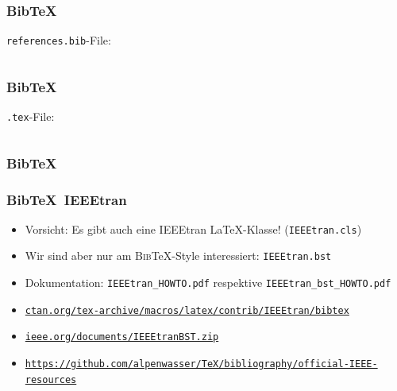 \documentclass{beamer}                %
\newcommand*\code[1]{\texttt{#1}}
\begin{document}
\begin{frame}[fragile] %
    \frametitle{Bib\TeX}

    \code{references.bib}-File:

    \inputminted{tex}{code/references.bib}
\end{frame}
\begin{frame}[fragile] %
    \frametitle{Bib\TeX}

    \code{.tex}-File:

    \inputminted{tex}{code/bibtex.tex}
\end{frame}
\begin{frame} %
    \frametitle{Bib\TeX}

\end{frame}
\begin{frame} %
    \frametitle{Bib\TeX\ IEEEtran}

    \begin{itemize}
        \item
            \alert{Vorsicht:} Es    gibt     auch    eine    \textsf{IEEEtran}
            \LaTeX-Klasse! (\code{IEEEtran.cls})
        \item
            Wir   sind  aber   nur  am   \textsc{Bib}\TeX-Style  interessiert:
            \code{IEEEtran.\alert{bst}}
        \item
            Dokumentation:         \code{IEEEtran\_HOWTO.pdf}        respektive
            \code{IEEEtran\_bst\_HOWTO.pdf}
        \item
            \href{http://ctan.org/tex-archive/macros/latex/contrib/IEEEtran/bibtex}
                 {\nolinkurl{ctan.org/tex-archive/macros/latex/contrib/IEEEtran/bibtex}}
        \item
            \href{http://www.ieee.org/documents/IEEEtranBST.zip}
                 {\nolinkurl{ieee.org/documents/IEEEtranBST.zip}}
        \item
            \href{https://github.com/alpenwasser/TeX/tree/master/bibliography/official-IEEE-resources}
                 {\nolinkurl{https://github.com/alpenwasser/TeX/bibliography/official-IEEE-resources}}
    \end{itemize}
\end{frame}
\end{document}

